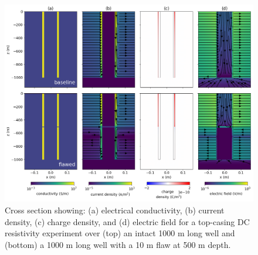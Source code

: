 \begin{figure}
    \begin{center}
    \includegraphics[width=\textwidth]{figures/dc_casing/casing_integrity_basics.png}
    \end{center}
\caption{
    Cross section showing: (a) electrical conductivity, (b) current density, (c) charge density, and (d) electric field
    for a top-casing DC resistivity experiment over (top) an intact 1000 m long well and (bottom) a 1000 m long well
    with a 10 m flaw at 500 m depth.
}
\label{fig:casing_integrity_basics}
\end{figure}
